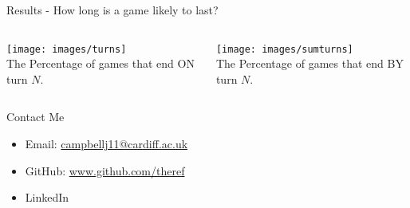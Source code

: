 \documentclass{beamer}
\begin{document}
\begin{frame}{Results - How long is a game likely to last?}
  \begin{columns}
      \begin{center}
      \texttt{[image: images/turns]}\\
      The Percentage of games that end ON turn $N$.
      \end{center}
      \begin{center}
      \texttt{[image: images/sumturns]}\\
      The Percentage of games that end BY turn $N$.
      \end{center}
  \end{columns}
\end{frame}

\begin{frame}{Contact Me}
  \begin{itemize}
    \itemsep2em
    \item Email: \href{mailto:campbellj11@cardiff.ac.uk}{campbellj11@cardiff.ac.uk}

    \item GitHub: \href{https://github.com/theref}{www.github.com/theref}

    \item LinkedIn
  \end{itemize}
\end{frame}
\end{document}
